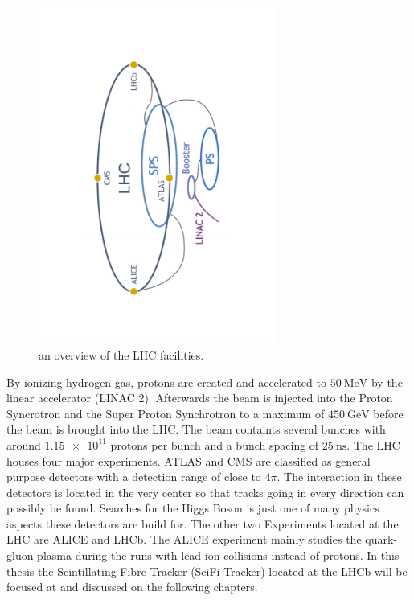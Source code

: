 \begin{figure}
  \centering
  \includegraphics[angle=-90, origin=c, width=0.7\textwidth]{plots/CERN_layout.pdf}
  \caption{an overview of the LHC facilities.}
  \label{fig:CERN}
\end{figure}

By ionizing hydrogen gas, protons are created and accelerated to $\SI{50}{\mega\electronvolt}$ by the linear accelerator (LINAC 2). Afterwards the beam is injected into the Proton Syncrotron and the Super Proton Synchrotron to a maximum of $\SI{450}{\giga\electronvolt}$ before the beam is brought into the LHC.
The beam containts several bunches with around $\num{1.15e11}$ protons per bunch and a bunch spacing of $\SI{25}{\nano\second}$.%
The LHC houses four major experiments. ATLAS and CMS are classified as general purpose detectors with a detection range of close to $4\pi$. The interaction in these detectors is located in the very center so that tracks going in every direction can possibly be found. Searches for the Higgs Boson is just one of many physics aspects these detectors are build for.
The other two Experiments located at the LHC are ALICE and LHCb.
The ALICE experiment mainly studies the quark-gluon plasma during the runs with lead ion collisions instead of protons.
In this thesis the Scintillating Fibre Tracker (SciFi Tracker) located at the LHCb will be focused at and discussed on the following chapters.

